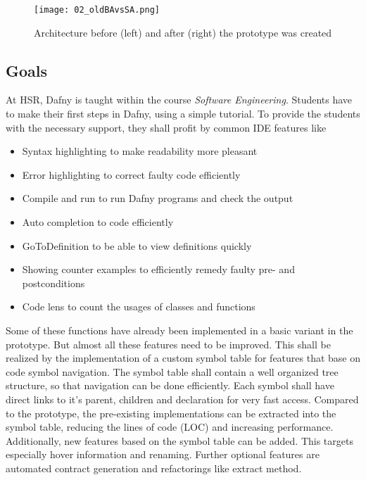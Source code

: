 \begin{figure}[ht]
    \centering
    \texttt{[image: 02\_oldBAvsSA.png]}
    \caption{Architecture before (left) and after (right) the prototype was created}
    \label{fig:oldBAvsSA}
\end{figure}


\subsection{Goals}
At HSR, Dafny is taught within the course \textit{Software Engineering}.
Students have to make their first steps in Dafny, using a simple tutorial.
To provide the students with the necessary support, they shall profit by common IDE features like
\begin{itemize}
    \item Syntax highlighting to make readability more pleasant
    \item Error highlighting to correct faulty code efficiently
    \item Compile and run to run Dafny programs and check the output
    \item Auto completion to code efficiently
    \item GoToDefinition to be able to view definitions quickly
    \item Showing counter examples to efficiently remedy faulty pre- and postconditions
    \item Code lens to count the usages of classes and functions
\end{itemize}

Some of these functions have already been implemented in a basic variant in the prototype.
But almost all these features need to be improved.
This shall be realized by the implementation of a custom symbol table for features that base on code symbol navigation.
The symbol table shall contain a well organized tree structure, so that navigation can be done efficiently.
Each symbol shall have direct links to it's parent, children and declaration for very fast access.
Compared to the prototype, the pre-existing implementations can be extracted into the symbol table,
reducing the lines of code (LOC) and increasing performance. \\

Additionally, new features based on the symbol table can be added.
This targets especially hover information and renaming.
Further optional features are automated contract generation and refactorings like extract method. \\

